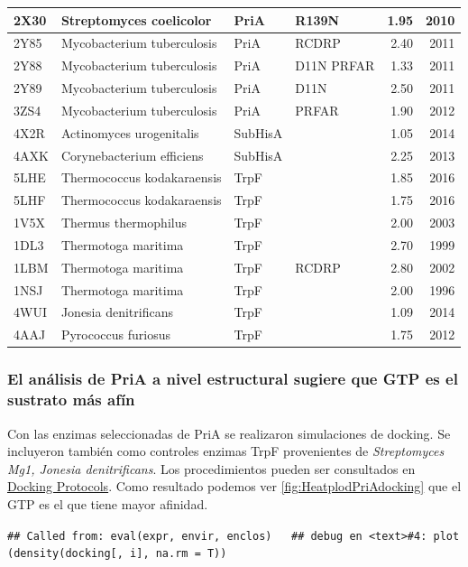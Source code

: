 \documentclass[]{article}
\begin{document}
{\begin{table}[t]
{\begin{tabular}{l|l|l|l|r|r}
\hline
2X30 & Streptomyces coelicolor & PriA & R139N & 1.95 & 2010\\
\hline
2Y85 & Mycobacterium tuberculosis & PriA & RCDRP & 2.40 & 2011\\
\hline
2Y88 & Mycobacterium tuberculosis & PriA & D11N PRFAR & 1.33 & 2011\\
\hline
2Y89 & Mycobacterium tuberculosis & PriA & D11N & 2.50 & 2011\\
\hline
3ZS4 & Mycobacterium tuberculosis & PriA & PRFAR & 1.90 & 2012\\
\hline
4X2R & Actinomyces urogenitalis & SubHisA &  & 1.05 & 2014\\
\hline
4AXK & Corynebacterium efficiens & SubHisA &  & 2.25 & 2013\\
\hline
5LHE & Thermococcus kodakaraensis & TrpF &  & 1.85 & 2016\\
\hline
5LHF & Thermococcus kodakaraensis & TrpF &  & 1.75 & 2016\\
\hline
1V5X & Thermus thermophilus & TrpF &  & 2.00 & 2003\\
\hline
1DL3 & Thermotoga maritima & TrpF &  & 2.70 & 1999\\
\hline
1LBM & Thermotoga maritima & TrpF & RCDRP & 2.80 & 2002\\
\hline
1NSJ & Thermotoga maritima & TrpF &  & 2.00 & 1996\\
\hline
4WUI & Jonesia denitrificans & TrpF &  & 1.09 & 2014\\
\hline
4AAJ & Pyrococcus furiosus & TrpF &  & 1.75 & 2012\\
\hline
\end{tabular}}
\end{table}

\subsubsection{El análisis de PriA a nivel estructural sugiere que GTP
es el sustrato más
afín}\label{el-analisis-de-pria-a-nivel-estructural-sugiere-que-gtp-es-el-sustrato-mas-afin}

Con las enzimas seleccionadas de PriA se realizaron simulaciones de
docking. Se incluyeron también como controles enzimas TrpF provenientes
de \emph{Streptomyces Mg1, Jonesia denitrificans}. Los procedimientos
pueden ser consultados en
\href{https://github.com/tripplab/Docking/wiki}{Docking Protocols}. Como
resultado podemos ver \autoref{fig:HeatplodPriAdocking} que el GTP es el
que tiene mayor afinidad.

\texttt{\#\#\ Called\ from:\ eval(expr,\ envir,\ enclos)\ \ \ \#\#\ debug\ en\ \textless{}text\textgreater{}\#4:\ plot(density(docking{[},\ i{]},\ na.rm\ =\ T))}

}
\end{document}
